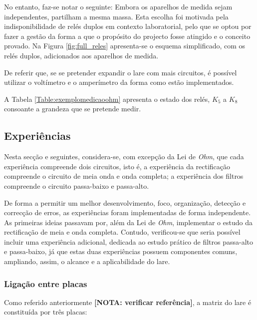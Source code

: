 No entanto, faz-se notar o seguinte: Embora os aparelhos de medida sejam independentes, partilham a mesma massa. Esta escolha foi motivada pela indisponibilidade de relés duplos em contexto laboratorial, pelo que se optou por fazer a gestão da forma a que o propósito do projecto fosse atingido e o conceito provado. Na Figura \ref{fig:full_reles} apresenta-se o esquema simplificado, com os relés duplos, adicionados aos aparelhos de medida. 

De referir que, se se pretender expandir o \acrshort{lare} com mais circuitos, é possível utilizar o voltímetro e o amperímetro da forma como estão implementados. 

A Tabela \ref{Table:exemplomedicaoohm} apresenta o estado dos relés, $K_{5}$ a $K_{8}$ consoante a grandeza que se pretende medir.

\subsection{Experiências}
\label{sec:experiencias}
Nesta secção e seguintes, considera-se, com excepção da Lei de \textit{Ohm}, que cada experiência compreende dois circuitos, isto é, a experiência da rectificação compreende o circuito de meia onda e onda completa; a experiência dos filtros compreende o circuito passa-baixo e passa-alto.

De forma a permitir um melhor desenvolvimento, foco, organização, detecção e correcção de erros, as experiências foram implementadas de forma independente. As primeiras ideias passavam por, além da Lei de \textit{Ohm}, implementar o estudo da rectificação de meia e onda completa. Contudo, verificou-se que seria possível incluir uma experiência adicional, dedicada ao estudo prático de filtros passa-alto e passa-baixo, já que estas duas experiências possuem componentes comuns, ampliando, assim, o alcance e a aplicabilidade do \acrshort{lare}.

\subsubsection{Ligação entre placas}
\label{sec:ligacaoplacas}
Como referido anteriormente \textbf{[NOTA: verificar referência]}, a matriz do \acrshort{lare} é constituída por três placas: 


